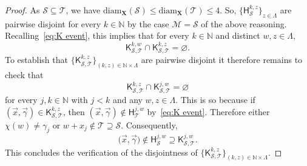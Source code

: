 \documentclass[11pt,reqno]{amsart}
\renewcommand{\le}{\leqslant}
\newcommand{\diam}{\mathrm{diam}}
\newcommand{\X}{\mathbf X}
\theoremstyle{remark}
\renewcommand{\supset}{\supseteq}
\renewcommand{\subset}{\subseteq}
\newcommand{\N}{\mathbb N}
\renewcommand{\emptyset}{\varnothing}
\renewcommand{\1}{\mathbf 1}
\begin{document}
\begin{proof}
As $\mathscr{S}\subset \mathscr{T}$, we have $\diam_{\X}(\mathscr{S})\le\diam_{\X}(\mathscr{T})\le 4$. So, $\{\mathsf{H}_{\mathscr{S}}^{k,z}\}_{z\in \Lambda}$ are pairwise disjoint for every $k\in \N$ by the case $\mathscr{M}=\mathscr{S}$ of the above reasoning. Recalling~\eqref{eq:K event}, this implies that for every $k\in \N$ and distinct $w,z\in \Lambda$, $$ \mathsf{K}_{\mathscr{S,T}}^{k,w}\cap \mathsf{K}_{\mathscr{S,T}}^{k,z}=\emptyset.$$
To establish that $\{\mathsf{K}_{\mathscr{S,T}}^{k,z}\}_{(k,z)\in \N\times \Lambda}$ are pairwise disjoint it therefore remains to check that $$\mathsf{K}_{\mathscr{S,T}}^{k,z}\cap \mathsf{K}_{\mathscr{S,T}}^{j,w}=\emptyset$$ for every $j,k\in \N$ with $j<k$ and any $w,z\in \Lambda$. This is so because if $(\vec{x},\vec{\gamma})\in \mathsf{K}_{\mathscr{S,T}}^{k,z}$, then $(\vec{x},\vec{\gamma})\notin \mathsf{H}_{\mathscr{T}}^{j,w}$ by~\eqref{eq:K event}. Therefore either $\chi(w)\neq \gamma_j$ or $w+x_j\notin \mathscr{T}\supset \mathscr{S}$.  Consequently, $$\big(\vec{x},\vec{\gamma}\big)\notin \mathsf{H}_{\mathscr{S}}^{j,w}\supset \mathsf{K}_{\mathscr{S,T}}^{j,w}.$$
This concludes the verification of the disjointness of $\{\mathsf{K}_{\mathscr{S,T}}^{k,z}\}_{(k,z)\in \N\times \Lambda}$.


\end{proof}
\end{document}
